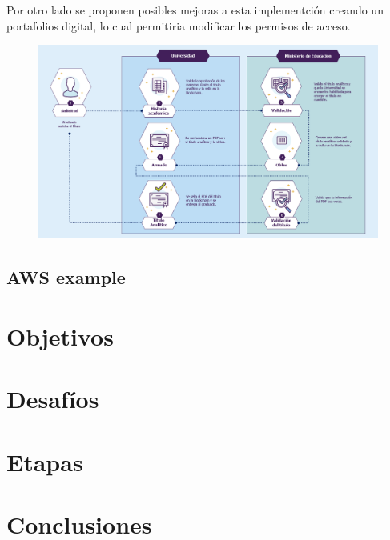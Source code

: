 \documentclass[11pt,a4paper]{article}
\begin{document}
        Por otro lado se proponen posibles mejoras a esta implementción creando un portafolios digital, lo cual 
        permitiria modificar los permisos de acceso.

        \begin{figure}
            \centering
            \includegraphics[width=\textwidth]{Img/cuadro_problematica.png}
            \caption{}
            \label{fig:cuadro_problematica}
        \end{figure}

        \subsection{AWS example}
    \section{Objetivos}

    \section{Desafíos}

    \section{Etapas}

    \section{Conclusiones}
\end{document}
